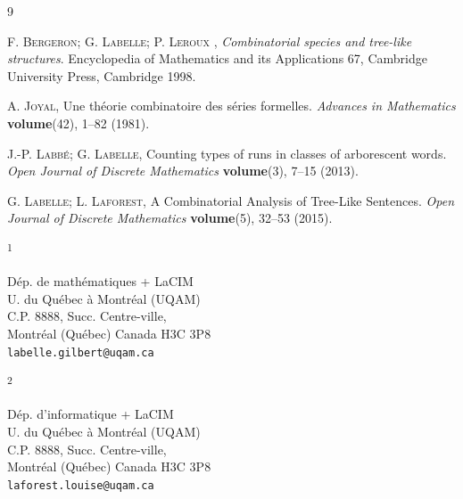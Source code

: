 \documentclass{article}
\newcommand{\ADDRESS}[2]{\noindent
  \textsuperscript{#1}\parbox[t]{0.9\textwidth}{#2} \vspace{6pt}}
\begin{document}


\begin{thebibliography}{9}

   \textsc{F. Bergeron; G. Labelle; P. Leroux }, \emph{Combinatorial species and tree-like structures}.
    Encyclopedia of Mathematics and its Applications 67, Cambridge University Press, Cambridge 1998.

   \textsc{A. Joyal}, Une th\'{e}orie combinatoire des s\'{e}ries formelles.
  \emph{Advances in Mathematics} \textbf{volume}(42), 1--82  (1981).

   \textsc{J.-P. Labb\'{e}; G. Labelle}, Counting types of runs in classes of arborescent words.
  \emph{Open Journal of Discrete Mathematics} \textbf{volume}(3), 7--15  (2013).

   \textsc{G. Labelle; L. Laforest}, A Combinatorial Analysis of Tree-Like Sentences.
  \emph{Open Journal of Discrete Mathematics} \textbf{volume}(5), 32--53  (2015).


\end{thebibliography}

\vspace{1cm}

\ADDRESS{1}{
D\'ep. de math\'ematiques + LaCIM  \\U. du Qu\'ebec \`a Montr\'eal (UQAM) \\
C.P. 8888, Succ. Centre-ville, \\
Montr\'eal (Qu\'ebec) Canada H3C 3P8\\
\texttt{labelle.gilbert@uqam.ca}
}

\vspace{.5cm}

\ADDRESS{2}{
D\'ep. d'informatique + LaCIM  \\U. du Qu\'ebec \`a Montr\'eal (UQAM) \\
C.P. 8888, Succ. Centre-ville, \\
Montr\'eal (Qu\'ebec) Canada H3C 3P8\\
\texttt{laforest.louise@uqam.ca}
}
\end{document}

